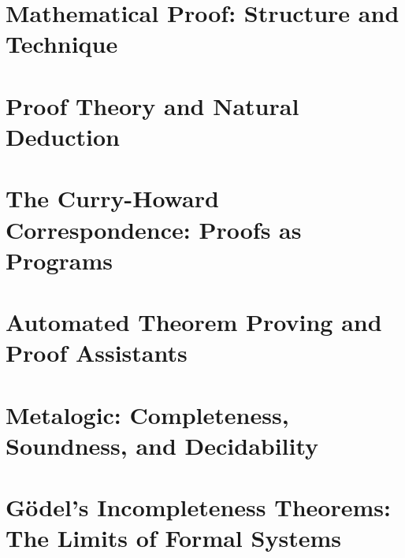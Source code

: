 \chapter{Mathematical Proof: Structure and Technique}
\chapter{Proof Theory and Natural Deduction}
\chapter{The Curry-Howard Correspondence: Proofs as Programs}
\chapter{Automated Theorem Proving and Proof Assistants}
\chapter{Metalogic: Completeness, Soundness, and Decidability}
\chapter{Gödel's Incompleteness Theorems: The Limits of Formal Systems}